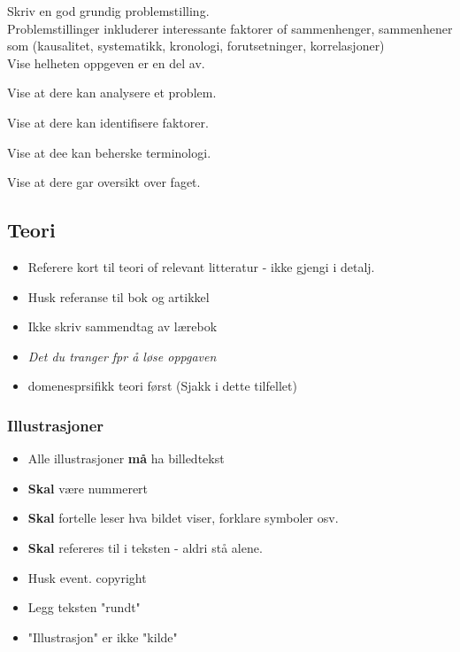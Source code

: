 Skriv en god grundig problemstilling. \\

Problemstillinger inkluderer interessante faktorer of sammenhenger, sammenhener som (kausalitet, systematikk, kronologi, forutsetninger, korrelasjoner) \\

Vise helheten oppgeven er en del av. 

Vise at dere kan analysere et problem. 

Vise at dere kan identifisere faktorer.

Vise at dee kan beherske terminologi.

Vise at dere gar oversikt over faget.

\subsection*{Teori}

\begin{itemize}
    \item Referere kort til teori of relevant litteratur - ikke gjengi i detalj.
    \item Husk referanse til bok og artikkel
    \item Ikke skriv sammendtag av lærebok
    \item \textit{Det du tranger fpr å løse oppgaven}
    \item domenesprsifikk teori først (Sjakk i dette tilfellet)
\end{itemize}

\subsubsection*{Illustrasjoner}

\begin{itemize}
    \item Alle illustrasjoner \textbf{må} ha billedtekst 
    \item \textbf{Skal} være nummerert 
    \item \textbf{Skal} fortelle leser hva bildet viser, forklare symboler osv. 
    \item \textbf{Skal} refereres til i teksten - aldri stå alene. 
    \item Husk event. copyright 
    \item Legg teksten "rundt" 
    \item "Illustrasjon" er ikke "kilde"
\end{itemize}

